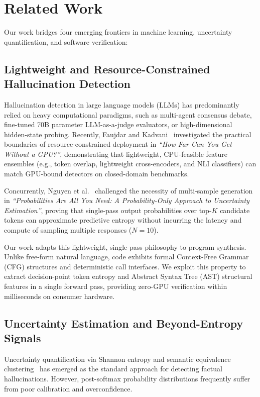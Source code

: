 
\section{Related Work}
\label{sec:related_work}

Our work bridges four emerging frontiers in machine learning, uncertainty quantification, and software verification:

\subsection{Lightweight and Resource-Constrained Hallucination Detection}
Hallucination detection in large language models (LLMs) has predominantly relied on heavy computational paradigms, such as multi-agent consensus debate, fine-tuned 70B parameter LLM-as-a-judge evaluators, or high-dimensional hidden-state probing. Recently, Faujdar and Kadvani~\cite{faujdar2026gpu} investigated the practical boundaries of resource-constrained deployment in \emph{``How Far Can You Get Without a GPU?''}, demonstrating that lightweight, CPU-feasible feature ensembles (e.g., token overlap, lightweight cross-encoders, and NLI classifiers) can match GPU-bound detectors on closed-domain benchmarks. 

Concurrently, Nguyen et al.~\cite{nguyen2026probabilities} challenged the necessity of multi-sample generation in \emph{``Probabilities Are All You Need: A Probability-Only Approach to Uncertainty Estimation''}, proving that single-pass output probabilities over top-$K$ candidate tokens can approximate predictive entropy without incurring the latency and compute of sampling multiple responses ($N=10$). 

Our work adapts this lightweight, single-pass philosophy to program synthesis. Unlike free-form natural language, code exhibits formal Context-Free Grammar (CFG) structures and deterministic call interfaces. We exploit this property to extract decision-point token entropy and Abstract Syntax Tree (AST) structural features in a single forward pass, providing zero-GPU verification within milliseconds on consumer hardware.

\subsection{Uncertainty Estimation and Beyond-Entropy Signals}
Uncertainty quantification via Shannon entropy and semantic equivalence clustering~\cite{kuhn2023semantic} has emerged as the standard approach for detecting factual hallucinations. However, post-softmax probability distributions frequently suffer from poor calibration and overconfidence. 

